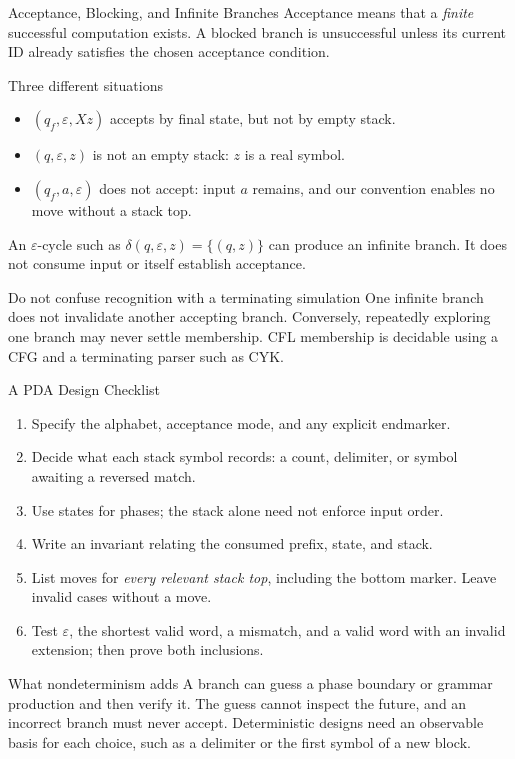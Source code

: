 \documentclass[10pt]{beamer}
\begin{document}
\begin{frame}{Acceptance, Blocking, and Infinite Branches}
  \small
  Acceptance means that a \emph{finite} successful computation exists.
  A blocked branch is unsuccessful unless its current ID already satisfies
  the chosen acceptance condition.
  \begin{block}{Three different situations}
    \begin{itemize}
      \item $(q_f,\varepsilon,Xz)$ accepts by final state, but not by empty stack.
      \item $(q,\varepsilon,z)$ is not an empty stack: $z$ is a real symbol.
      \item $(q_f,a,\varepsilon)$ does not accept: input $a$ remains, and
        our convention enables no move without a stack top.
    \end{itemize}
  \end{block}
  \pause
  An $\varepsilon$-cycle such as $\delta(q,\varepsilon,z)=\{(q,z)\}$ can
  produce an infinite branch. It does not consume input or itself establish acceptance.
  \begin{alertblock}{Do not confuse recognition with a terminating simulation}
    One infinite branch does not invalidate another accepting branch.
    Conversely, repeatedly exploring one branch may never settle membership.
    CFL membership is decidable using a CFG and a terminating parser such as CYK.
  \end{alertblock}
\end{frame}


\begin{frame}{A PDA Design Checklist}
  \small
  \begin{enumerate}
    \item Specify the alphabet, acceptance mode, and any explicit endmarker.
    \item Decide what each stack symbol records: a count, delimiter, or
      symbol awaiting a reversed match.
    \item Use states for phases; the stack alone need not enforce input order.
    \item Write an invariant relating the consumed prefix, state, and stack.
    \item List moves for \emph{every relevant stack top}, including the
      bottom marker. Leave invalid cases without a move.
    \item Test $\varepsilon$, the shortest valid word, a mismatch, and a
      valid word with an invalid extension; then prove both inclusions.
  \end{enumerate}
  \pause
  \begin{block}{What nondeterminism adds}
    A branch can guess a phase boundary or grammar production and then
    verify it. The guess cannot inspect the future, and an incorrect branch
    must never accept. Deterministic designs need an observable basis for
    each choice, such as a delimiter or the first symbol of a new block.
  \end{block}
\end{frame}
\end{document}

